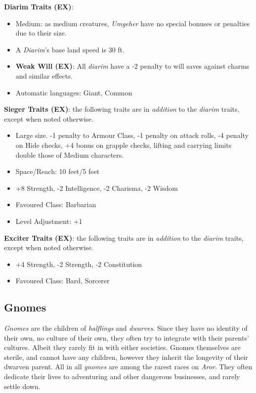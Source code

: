 \begin{35e}
  \textbf{Diarim Traits (EX)}:
  \begin{itemize}[noitemsep]
    \item Medium: as medium creatures, \emph{Umgeher} have no special bonuses or
    penalties due to their size.
    \item A \emph{Diarim}'s base land speed is 30 ft.
    \item \textbf{Weak Will (EX)}: All \emph{diarim} have a -2 penalty to will
    saves against charms and similar effects.
    \item Automatic languages: Giant, Common
  \end{itemize}

  \textbf{Sieger Traits (EX)}: the following traits are in \emph{addition} to
  the \emph{diarim} traits, except when noted otherwise.
  \begin{itemize}[noitemsep]
    \item Large size. -1 penalty to Armour Class, -1 penalty on attack rolls,
    -4 penalty on Hide checks, +4 bonus on grapple checks, lifting and
    carrying limits double those of Medium characters.
    \item Space/Reach: 10 feet/5 feet
    \item +8 Strength, -2 Intelligence, -2 Charisma, -2 Wisdom
    \item Favoured Class: Barbarian
    \item Level Adjustment: +1
  \end{itemize}

  \textbf{Exciter Traits (EX)}: the following traits are in \emph{addition} to
  the \emph{diarim} traits, except when noted otherwise.
  \begin{itemize}[noitemsep]
    \item +4 Strength, -2 Strength, -2 Constitution
    \item Favoured Class: Bard, Sorcerer
  \end{itemize}
\end{35e}

\subsection*{Gnomes}

\emph{Gnomes} are the children of \emph{halflings} and \emph{dwarves}. Since
they have no identity of their own, no culture of their own, they often try to
integrate with their parents' cultures. Albeit they rarely fit in with either
societies. Gnomes themselves are sterile, and cannot have any children,
however they inherit the longevity of their dwarven parent. All in
all \emph{gnomes} are among the rarest races on \emph{Aror}. They often
dedicate their lives to adventuring and other dangerous businesses, and rarely
settle down.

